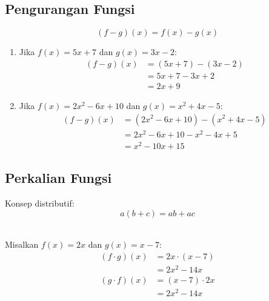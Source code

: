 \subsection{Pengurangan Fungsi}
\begin{definition}
  \[ (f - g)(x) = f(x) - g(x) \]
\end{definition}

\begin{example}
  \hfill 
  \begin{enumerate}
  \item Jika $f(x) = 5x + 7$ dan $g(x) = 3x - 2$:
    \[
    \begin{aligned}
      (f - g)(x) &= (5x + 7) - (3x - 2) \\
      &= 5x + 7 - 3x + 2 \\
      &= 2x + 9
    \end{aligned}
    \]
  \item Jika $f(x) = 2x^2 - 6x + 10$ dan $g(x) = x^2 + 4x - 5$:
    \[
    \begin{aligned}
      (f - g)(x) &= (2x^2 - 6x + 10) - (x^2 + 4x - 5) \\
      &= 2x^2 - 6x + 10 - x^2 - 4x + 5 \\
      &= x^2 - 10x + 15
    \end{aligned}
    \]
  \end{enumerate}
\end{example}

\subsection{Perkalian Fungsi}
\begin{definition}
  Konsep distributif:
  \[ a(b + c) = ab + ac \]
\end{definition}

\begin{example}
  \hfill \\
  Misalkan $f(x) = 2x$ dan $g(x) = x - 7$:
  \[
  \begin{aligned}
    (f \cdot g)(x) &= 2x \cdot (x - 7) \\
    &= 2x^2 - 14x
  \end{aligned}
  \]
  \[
  \begin{aligned}
    (g \cdot f)(x) &= (x - 7) \cdot 2x \\
    &= 2x^2 - 14x
  \end{aligned}
  \]
\end{example}

